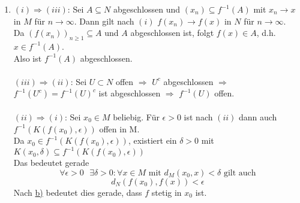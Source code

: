 \begin{prop}
\begin{beweis}
\begin{enumerate}[label=\alph*\upshape)]
			\item $(i) \Rightarrow (iii)$: Sei $A \subseteq N$ abgeschlossen und $(x_{n}) \subseteq f^{-1}(A)$ mit $x_{n} \rightarrow x$ in $M$ für $n \rightarrow \infty$. Dann gilt nach $(i)$ $f(x_{n}) \rightarrow f(x)$ in $N$ für $n \rightarrow \infty$. \\
				Da $(f(x_{n}))_{n \geq 1} \subseteq A$ und $A$ abgeschlossen ist, folgt $f(x) \in A$, d.h. $x \in f^{-1}(A)$. \\
				Also ist $f^{-1}(A)$ abgeschlossen. \\ \\
				$(iii) \Rightarrow (ii)$: Sei $U \subset N$ offen $\Rightarrow$ $U^{c}$ abgeschlossen $\Rightarrow$ $f^{-1}(U^{c}) = f^{-1}(U)^{c}$ ist abgeschlossen $\Rightarrow$ $f^{-1}(U)$ offen. \\ \\
				$(ii) \Rightarrow (i)$: 	Sei $x_{0} \in M$ beliebig. Für $\epsilon > 0$ ist nach $(ii)$ dann auch $f^{-1}(K(f(x_{0}), \epsilon))$ offen in M. \\
				Da $x_{0} \in f^{-1}(K(f(x_{0}), \epsilon))$, existiert ein $\delta > 0$ mit $K(x_{0}, \delta) \subseteq f^{-1}(K(f(x_{0}),\epsilon))$\\
				Das bedeutet gerade
				\[ \forall \epsilon > 0 \text{ } \exists \delta > 0: \forall x \in M \text{ mit } d_{M}(x_{0}, x) < \delta \text{ gilt auch} \]
				\[ d_{N}(f(x_{0}), f(x)) < \epsilon \]
				Nach \hyperref[prop:4.13.b]{b)} bedeutet dies gerade, dass $f$ stetig in $x_{0}$ ist.
		\end{enumerate}
	\end{beweis}
\end{prop}


